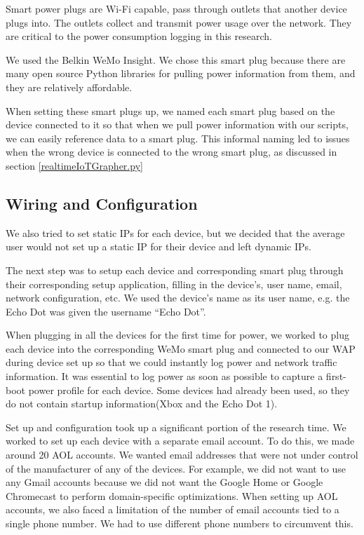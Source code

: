 Smart power plugs are Wi-Fi capable, pass through outlets that another device plugs into. The outlets collect and transmit power usage over the network. They are critical to the power consumption logging in this research.

We used the Belkin WeMo Insight. We chose this smart plug because there are many open source Python libraries for pulling power information from them, and they are relatively affordable.

When setting these smart plugs up, we named each smart plug based on the device connected to it so that when we pull power information with our scripts, we can easily reference data to a smart plug. This informal naming led to issues when the wrong device is connected to the wrong smart plug, as discussed in section \ref{realtimeIoTGrapher.py}

\subsection{Wiring and Configuration}

We also tried to set static IPs for each device, but we decided that the average user would not set up a static IP for their device and left dynamic IPs.

The next step was to setup each device and corresponding smart plug through their corresponding setup application, filling in the device's, user name, email, network configuration, etc. We used the device's name as its user name, e.g. the Echo Dot was given the username ``Echo Dot''.

When plugging in all the devices for the first time for power, we worked to plug each device into the corresponding WeMo smart plug and connected to our WAP during device set up so that we could instantly log power and network traffic information. It was essential to log power as soon as possible to capture a first-boot power profile for each device. Some devices had already been used, so they do not contain startup information(Xbox and the Echo Dot 1).

Set up and configuration took up a significant portion of the research time. We worked to set up each device with a separate email account. To do this, we made around 20 AOL accounts. We wanted email addresses that were not under control of the manufacturer of any of the devices. For example, we did not want to use any Gmail accounts because we did not want the Google Home or Google Chromecast to perform domain-specific optimizations. When setting up AOL accounts, we also faced a limitation of the number of email accounts tied to a single phone number. We had to use different phone numbers to circumvent this.

